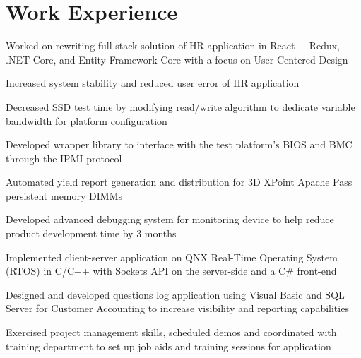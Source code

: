 \documentclass[]{deedy-resume-openfont}
\begin{document}
\hfill
\begin{minipage}[t]{0.66\textwidth} 


\section{Work Experience}

\vspace{\topsep} %
\begin{tightemize}\item Worked on rewriting full stack solution of HR application in React + Redux, .NET Core, and Entity Framework Core with a focus on User Centered Design \item Increased system stability and reduced user error of HR application
\end{tightemize}
\sectionsep

\begin{tightemize}
\item Decreased SSD test time by modifying read/write algorithm to dedicate variable bandwidth for platform configuration \item	Developed wrapper library to interface with the test platform’s BIOS and BMC through the IPMI protocol \item Automated yield report generation and distribution for 3D XPoint Apache Pass persistent memory DIMMs\end{tightemize}
\sectionsep

\begin{tightemize}
\item Developed advanced debugging system for monitoring device to help reduce product development time by 3 months\item Implemented client-server application on QNX Real-Time Operating System (RTOS) in C/C++ with Sockets API on the server-side and  a C\# front-end \end{tightemize}
\sectionsep

\begin{tightemize}
\item Designed and developed questions log application using Visual Basic and SQL Server for Customer Accounting to increase visibility and reporting capabilities \item	Exercised project management skills, scheduled demos and coordinated with training department to set up job aids and training sessions for application \end{tightemize}
\sectionsep


\end{minipage}
\end{document}
